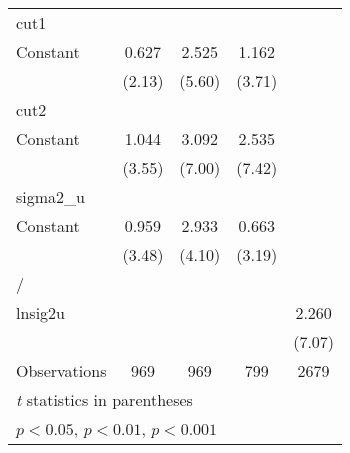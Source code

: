 {\begin{tabular}{l*{4}{c}}
\hline
cut1                &                     &                     &                     &                     \\
Constant            &       0.627\sym{*}  &       2.525\sym{***}&       1.162\sym{***}&                     \\
                    &      (2.13)         &      (5.60)         &      (3.71)         &                     \\
\hline
cut2                &                     &                     &                     &                     \\
Constant            &       1.044\sym{***}&       3.092\sym{***}&       2.535\sym{***}&                     \\
                    &      (3.55)         &      (7.00)         &      (7.42)         &                     \\
\hline
sigma2\_u            &                     &                     &                     &                     \\
Constant            &       0.959\sym{***}&       2.933\sym{***}&       0.663\sym{**} &                     \\
                    &      (3.48)         &      (4.10)         &      (3.19)         &                     \\
\hline
/                   &                     &                     &                     &                     \\
lnsig2u             &                     &                     &                     &       2.260\sym{***}\\
                    &                     &                     &                     &      (7.07)         \\
\hline
Observations        &         969         &         969         &         799         &        2679         \\
\hline\hline
\multicolumn{5}{l}{\footnotesize \textit{t} statistics in parentheses}\\
\multicolumn{5}{l}{\footnotesize \sym{*} \(p<0.05\), \sym{**} \(p<0.01\), \sym{***} \(p<0.001\)}\\
\end{tabular}
}
